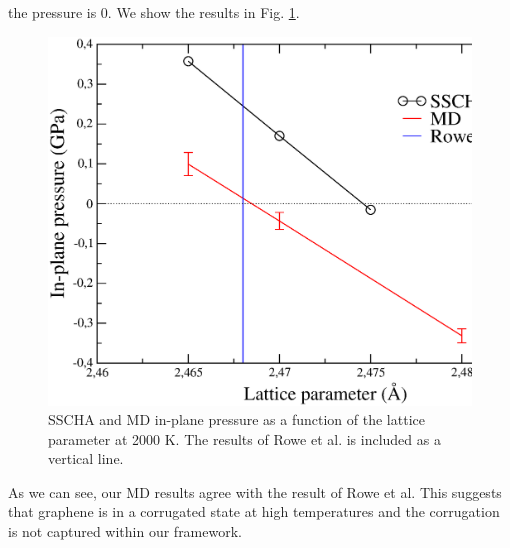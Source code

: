 the pressure is 0. We show the results in Fig. \ref{md2}. 
\begin{figure}[ht]
\includegraphics[width=0.99\linewidth]{Figures/md2.eps}
\caption[Molecular dynamics results.]{SSCHA and MD in-plane pressure as a function of the lattice parameter at 
2000 K. The results of Rowe et al. is included as a vertical line.}
\label{md2}
\end{figure}
As we can see, our MD results agree with the result of Rowe et al. This suggests that graphene is in a corrugated 
state at high temperatures and the corrugation is not captured within our framework. \\

